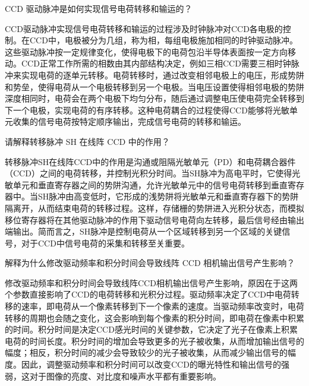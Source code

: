 \documentclass[dvipsnames, svgnames,a4paper,11pt]{article}
\begin{document}
	




\begin{question}
	CCD 驱动脉冲是如何实现信号电荷转移和输运的？
\end{question}

	CCD驱动脉冲实现信号电荷转移和输运的过程涉及时钟脉冲对CCD各电极的控制。在CCD中，电极被分为几组，称为相，每组电极施加相同的时钟驱动脉冲。这些驱动脉冲按一定规律变化，使得电极下的电荷包沿半导体表面按一定方向移动。CCD正常工作所需的相数由其内部结构决定，例如三相CCD需要三相时钟脉冲来实现电荷的逐单元转移。电荷转移时，通过改变相邻电极上的电压，形成势阱和势垒，使得电荷从一个电极转移到另一个电极。当电压设置使得相邻电极的势阱深度相同时，电荷会在两个电极下均匀分布，随后通过调整电压使电荷完全转移到下一个电极，实现电荷的有序转移。这种电荷耦合的过程使得CCD能够将光敏单元收集的信号电荷按特定顺序输出，完成信号电荷的转移和输运。








\begin{question}
	请解释转移脉冲 SH 在线阵 CCD 中的作用？
\end{question}

	转移脉冲SH在线阵CCD中的作用是沟通或阻隔光敏单元（PD）和电荷耦合器件（CCD）之间的电荷转移，并控制光积分时间。当SH脉冲为高电平时，它使得光敏单元和垂直寄存器之间的势阱沟通，允许光敏单元中的信号电荷转移到垂直寄存器中。当SH脉冲由高变低时，它形成的浅势阱将光敏单元和垂直寄存器下的势阱隔离开，从而结束电荷的转移过程。这样，存储栅的势阱进入光积分状态，而模拟移位寄存器将在其他驱动脉冲的作用下驱动信号电荷向左转移，最后信号经由输出端输出。简而言之，SH脉冲是控制电荷从一个区域转移到另一个区域的关键信号，对于CCD中信号电荷的采集和转移至关重要。










\begin{question}
	解释为什么修改驱动频率和积分时间会导致线阵 CCD 相机输出信号产生影响？
\end{question}

	修改驱动频率和积分时间会导致线阵CCD相机输出信号产生影响，原因在于这两个参数直接影响了CCD的电荷转移和光积分过程。驱动频率决定了CCD中电荷转移的速率，即电荷从一个像素转移到下一个像素的速度。当驱动频率改变时，电荷转移的周期也会随之变化，这会影响到每个像素的积分时间，即电荷在像素中积累的时间。积分时间是决定CCD感光时间的关键参数，它决定了光子在像素上积累电荷的时间长度。积分时间的增加会导致更多的光子被收集，从而增加输出信号的幅度；相反，积分时间的减少会导致较少的光子被收集，从而减少输出信号的幅度。因此，调整驱动频率和积分时间可以改变CCD的曝光特性和输出信号的强弱，这对于图像的亮度、对比度和噪声水平都有重要影响。
\end{document}
